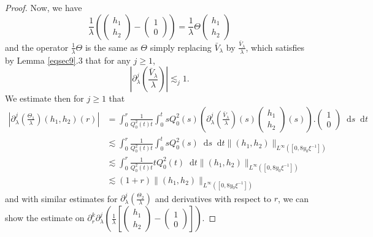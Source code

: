 \documentclass[10pt,a4paper]{amsart}
\newcommand{\dd}{\mathop{}\!\mathrm{d}}
\begin{document}
\begin{proof}
  Now, we have
  \[  \frac{1}{\lambda}\left( \left(\begin{array}{c}
       h_1\\
       h_2
     \end{array}\right) - \left(\begin{array}{c}
       1\\
       0
     \end{array}\right) \right) = \frac{1}{\lambda } \Theta
     \left(\begin{array}{c}
       h_1\\
       h_2
     \end{array}\right) \]
  and the operator $\frac{1}{\lambda} \Theta $ is the same as $\Theta$ simply
  replacing $\bar{V}_{\lambda}$ by $\frac{\bar{V}_{\lambda}}{\lambda}$, which
  satisfies by Lemma \ref{eqsec9}.3 that for any $j \geqslant 1$,
  \[ \left| \partial^j_{\lambda} \left( \frac{\bar{V}_{\lambda}}{\lambda}
     \right) \right| \lesssim_j 1. \]
  We estimate then for $j \geqslant 1$ that
\begin{align*}
\left| \partial_{\lambda}^j \left( \frac{\Theta_1}{\lambda} \right) (h_1, h_2) (r) \right| & =  \int_0^r \frac{1}{Q_0^2 (t) t} \int_0^t s Q_0^2 (s) \left(
    \partial_{\lambda}^j \left( \frac{\bar{V}_{\lambda}}{\lambda} \right) (s)
    \left(\begin{array}{c}
      h_1\\
      h_2
    \end{array}\right) (s) \right) . \left(\begin{array}{c}
      1\\
      0
    \end{array}\right) \dd s \dd t\\
    & \lesssim  \int_0^r \frac{1}{Q_0^2 (t) t} \int_0^t s Q_0^2 (s) \dd s \dd t
    \| (h_1, h_2) \|_{L^{\infty} ([0, 8 y_0 \xi^{- 1}])}\\
    & \lesssim  \int_0^r \frac{1}{Q_0^2 (t) t} t Q_0^2 (t)\dd t \| (h_1, h_2)
    \|_{L^{\infty} ([0, 8  y_0\xi^{- 1}])}\\
    & \lesssim  (1 + r) \| (h_1, h_2) \|_{L^{\infty} ([0, 8 y_0 \xi^{- 1}])}
  \end{align*}
  and with similar estimates for $\partial_{\lambda}^j \left(
  \frac{\Theta_2}{\lambda} \right)$ and derivatives with respect to $r$, we can show the estimate on $\partial_r^k \partial_{\lambda}^j \left(
  \frac{1}{\lambda} \left[ \left(\begin{array}{c}
    h_1\\
    h_2
  \end{array}\right) - \left(\begin{array}{c}
    1\\
    0
  \end{array}\right) \right]\right) $.
  

\end{proof}
\end{document}
